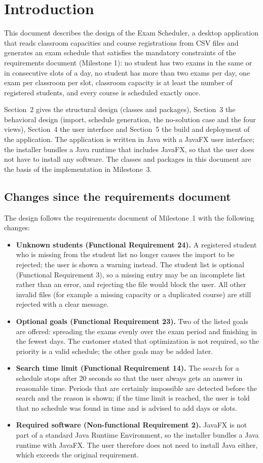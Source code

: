 \section{Introduction}
This document describes the design of the Exam Scheduler, a desktop application that reads classroom capacities and course registrations from CSV files and generates an exam schedule that satisfies the mandatory constraints of the requirements document (Milestone 1): no student has two exams in the same or in consecutive slots of a day, no student has more than two exams per day, one exam per classroom per slot, classroom capacity is at least the number of registered students, and every course is scheduled exactly once.

Section~2 gives the structural design (classes and packages), Section~3 the behavioral design (import, schedule generation, the no-solution case and the four views), Section~4 the user interface and Section~5 the build and deployment of the application. The application is written in Java with a JavaFX user interface; the installer bundles a Java runtime that includes JavaFX, so that the user does not have to install any software. The classes and packages in this document are the basis of the implementation in Milestone~3.

\subsection{Changes since the requirements document}
The design follows the requirements document of Milestone~1 with the following changes:
\begin{itemize}
\item \textbf{Unknown students (Functional Requirement 24).} A registered student who is missing from the student list no longer causes the import to be rejected; the user is shown a warning instead. The student list is optional (Functional Requirement 3), so a missing entry may be an incomplete list rather than an error, and rejecting the file would block the user. All other invalid files (for example a missing capacity or a duplicated course) are still rejected with a clear message.
\item \textbf{Optional goals (Functional Requirement 23).} Two of the listed goals are offered: spreading the exams evenly over the exam period and finishing in the fewest days. The customer stated that optimization is not required, so the priority is a valid schedule; the other goals may be added later.
\item \textbf{Search time limit (Functional Requirement 14).} The search for a schedule stops after 20 seconds so that the user always gets an answer in reasonable time. Periods that are certainly impossible are detected before the search and the reason is shown; if the time limit is reached, the user is told that no schedule was found in time and is advised to add days or slots.
\item \textbf{Required software (Non-functional Requirement 2).} JavaFX is not part of a standard Java Runtime Environment, so the installer bundles a Java runtime with JavaFX. The user therefore does not need to install Java either, which exceeds the original requirement.
\end{itemize}
